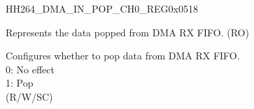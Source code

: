 \begin{register}{H}{H264\_DMA\_IN\_POP\_CH0\_REG}{0x0518}\label{regdesc:H264DMAINPOPCH0REG}
%
%
%
\regnewline%
\begin{regdesc}\begin{reglist}
\label{fielddesc:H264DMAINFIFORDATACH0}\item [H264\_DMA\_INFIFO\_RDATA\_CH0] Represents the data popped from DMA RX FIFO. (RO)
\label{fielddesc:H264DMAINFIFOPOPCH0}\item [H264\_DMA\_INFIFO\_POP\_CH0] Configures whether to pop data from DMA RX FIFO.\\
0: No effect\\
1: Pop\\ (R/W/SC)
\end{reglist}\end{regdesc}
\end{register}


